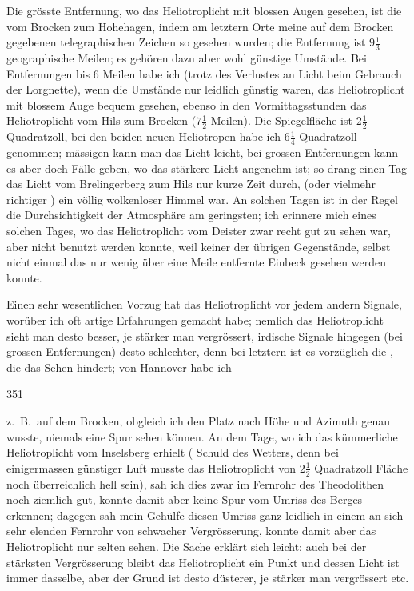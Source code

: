 \par\noindent\hspace*{\parindent}Die grösste Entfernung, wo das Heliotroplicht mit blossen Augen gesehen, ist die vom Brocken zum Hohehagen, indem am letztern Orte meine auf dem Brocken gegebenen telegraphischen Zeichen so gesehen wurden; die Entfernung ist \(9\frac{1}{3}\) geographische Meilen; es gehören dazu aber wohl günstige Umstände.
Bei Entfernungen bis 6 Meilen habe ich (trotz des Verlustes an Licht beim Gebrauch der Lorgnette), wenn die Umstände nur leidlich günstig waren, das Heliotroplicht mit blossem Auge bequem gesehen, ebenso in den Vormittagsstunden das Heliotroplicht vom Hils zum Brocken (\(7\frac{1}{2}\) Meilen).
Die Spiegelfläche ist \(2\frac{1}{2}\) Quadratzoll, bei den beiden neuen Heliotropen habe ich \(6\frac{1}{4}\) Quadratzoll genommen; mässigen kann man das Licht leicht, bei grossen Entfernungen kann es aber doch Fälle geben, wo das stärkere Licht angenehm ist; so drang einen Tag das Licht vom Brelingerberg zum Hils nur kurze Zeit durch,  (oder vielmehr richtiger ) ein völlig wolkenloser Himmel war.
An solchen Tagen ist in der Regel die Durchsichtigkeit der Atmosphäre am geringsten; ich erinnere mich eines solchen Tages, wo das Heliotroplicht vom Deister zwar recht gut zu sehen war, aber nicht benutzt werden konnte, weil keiner der übrigen Gegenstände, selbst nicht einmal das nur wenig über eine Meile entfernte Einbeck gesehen werden konnte.

\par\noindent\hspace*{\parindent}Einen sehr wesentlichen Vorzug hat das Heliotroplicht vor jedem andern Signale, worüber ich oft artige Erfahrungen gemacht habe; nemlich das Heliotroplicht sieht man desto besser, je stärker man vergrössert, irdische Signale hingegen (bei grossen Entfernungen) desto schlechter, denn bei letztern ist es vorzüglich die , die das Sehen hindert; von Hannover habe ich
\par\clearpage
{}\hfill351\par\medskip
\noindent z.~B.\ auf dem Brocken, obgleich ich den Platz nach Höhe und Azimuth genau wusste, niemals eine Spur sehen können.
An dem Tage, wo ich das kümmerliche Heliotroplicht vom Inselsberg erhielt ( Schuld des Wetters, denn bei einigermassen günstiger Luft musste das Heliotroplicht von \(2\frac{1}{2}\) Quadratzoll Fläche noch überreichlich hell sein), sah ich dies zwar im Fernrohr des Theodolithen noch ziemlich gut, konnte damit aber keine Spur vom Umriss des Berges erkennen; dagegen sah mein Gehülfe diesen Umriss ganz leidlich in einem an sich sehr elenden Fernrohr von schwacher Vergrösserung, konnte damit aber das Heliotroplicht nur selten sehen.
Die Sache erklärt sich leicht; auch bei der stärksten Vergrösserung bleibt das Heliotroplicht ein Punkt und dessen Licht ist immer dasselbe, aber der Grund ist desto düsterer, je stärker man vergrössert etc.

